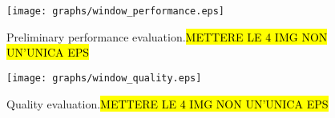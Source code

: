 \begin{figure}[!t]
  \texttt{[image: graphs/window\_performance.eps]}
  \caption{Preliminary performance evaluation.\hl{METTERE LE 4 IMG NON UN'UNICA EPS}}
  \label{fig:perf_window}
\end{figure}


\begin{figure}[!t]
  \texttt{[image: graphs/window\_quality.eps]}
  \caption{Quality evaluation.\hl{METTERE LE 4 IMG NON UN'UNICA EPS}}
  \label{fig:quality_window}
\end{figure}
